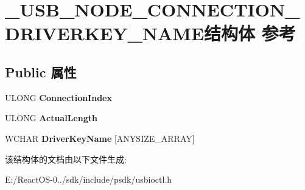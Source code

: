 \hypertarget{struct___u_s_b___n_o_d_e___c_o_n_n_e_c_t_i_o_n___d_r_i_v_e_r_k_e_y___n_a_m_e}{}\section{\+\_\+\+U\+S\+B\+\_\+\+N\+O\+D\+E\+\_\+\+C\+O\+N\+N\+E\+C\+T\+I\+O\+N\+\_\+\+D\+R\+I\+V\+E\+R\+K\+E\+Y\+\_\+\+N\+A\+M\+E结构体 参考}
\label{struct___u_s_b___n_o_d_e___c_o_n_n_e_c_t_i_o_n___d_r_i_v_e_r_k_e_y___n_a_m_e}
\subsection*{Public 属性}
\begin{DoxyCompactItemize}
\item 
\mbox{\label{struct___u_s_b___n_o_d_e___c_o_n_n_e_c_t_i_o_n___d_r_i_v_e_r_k_e_y___n_a_m_e_aecd8c36f6517e5aa7e97246b7afa59ca}} 
U\+L\+O\+NG {\bfseries Connection\+Index}
\item 
\mbox{\label{struct___u_s_b___n_o_d_e___c_o_n_n_e_c_t_i_o_n___d_r_i_v_e_r_k_e_y___n_a_m_e_affc2d7da10812b4f162ba4149a221318}} 
U\+L\+O\+NG {\bfseries Actual\+Length}
\item 
\mbox{\label{struct___u_s_b___n_o_d_e___c_o_n_n_e_c_t_i_o_n___d_r_i_v_e_r_k_e_y___n_a_m_e_a96a160f96915c0679d5cf1a1f783a1ce}} 
W\+C\+H\+AR {\bfseries Driver\+Key\+Name} \mbox{[}A\+N\+Y\+S\+I\+Z\+E\+\_\+\+A\+R\+R\+AY\mbox{]}
\end{DoxyCompactItemize}


该结构体的文档由以下文件生成\+:\begin{DoxyCompactItemize}
\item 
E\+:/\+React\+O\+S-\/0../sdk/include/psdk/usbioctl.\+h\end{DoxyCompactItemize}
